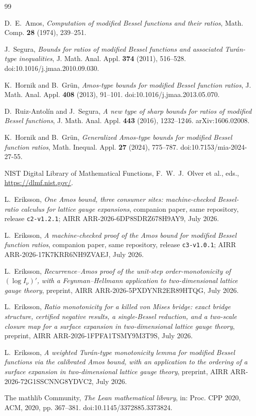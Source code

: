 \documentclass[11pt]{article}
\newcommand{\lean}[1]{\texttt{#1}}
\begin{document}
\begin{thebibliography}{99}

 D.~E.~Amos,
\emph{Computation of modified Bessel functions and their ratios},
Math. Comp. \textbf{28} (1974), 239--251.

 J.~Segura,
\emph{Bounds for ratios of modified Bessel functions and associated
Tur\'an-type inequalities},
J. Math. Anal. Appl. \textbf{374} (2011), 516--528.
doi:10.1016/j.jmaa.2010.09.030.

 K.~Hornik and B.~Gr\"un,
\emph{Amos-type bounds for modified Bessel function ratios},
J. Math. Anal. Appl. \textbf{408} (2013), 91--101.
doi:10.1016/j.jmaa.2013.05.070.

 D.~Ruiz-Antol\'in and J.~Segura,
\emph{A new type of sharp bounds for ratios of modified Bessel
functions}, J. Math. Anal. Appl. \textbf{443} (2016), 1232--1246.
arXiv:1606.02008.

 K.~Hornik and B.~Gr\"un,
\emph{Generalized Amos-type bounds for modified Bessel function
ratios}, Math. Inequal. Appl. \textbf{27} (2024), 775--787.
doi:10.7153/mia-2024-27-55.

 NIST Digital Library of Mathematical Functions,
F.~W.~J.~Olver et al., eds., \url{https://dlmf.nist.gov/}.

 L.~Eriksson,
\emph{One Amos bound, three consumer sites: machine-checked
Bessel-ratio calculus for lattice gauge expansions}, companion
paper, same repository, release \lean{c2-v1.2.1};
AIRR ARR-2026-6DP8SDRZ678H9AY9, July 2026.

 L.~Eriksson,
\emph{A machine-checked proof of the Amos bound for modified Bessel
function ratios}, companion paper, same repository, release
\lean{c3-v1.0.1}; AIRR ARR-2026-17K7KRR6NH9ZVAEJ, July 2026.

 L.~Eriksson,
\emph{Recurrence--Amos proof of the unit-step order-monotonicity of
$(\log I_\nu)'$, with a Feynman--Hellmann application to
two-dimensional lattice gauge theory}, preprint,
AIRR ARR-2026-5PXDYNR2ER89HTQG, July 2026.

 L.~Eriksson,
\emph{Ratio monotonicity for a killed von Mises bridge: exact bridge
structure, certified negative results, a single-Bessel reduction, and
a two-scale closure map for a surface expansion in two-dimensional
lattice gauge theory}, preprint, AIRR ARR-2026-1FPFA1TSMY9M3T9S, July 2026.

 L.~Eriksson,
\emph{A weighted Tur\'an-type monotonicity lemma for modified Bessel
functions via the calibrated Amos bound, with an application to the
ordering of a surface expansion in two-dimensional lattice gauge
theory}, preprint, AIRR ARR-2026-72G1SSCNNG8YDVC2, July 2026.

 The mathlib Community,
\emph{The Lean mathematical library}, in: Proc. CPP 2020, ACM, 2020,
pp. 367--381. doi:10.1145/3372885.3373824.

\end{thebibliography}
\end{document}
